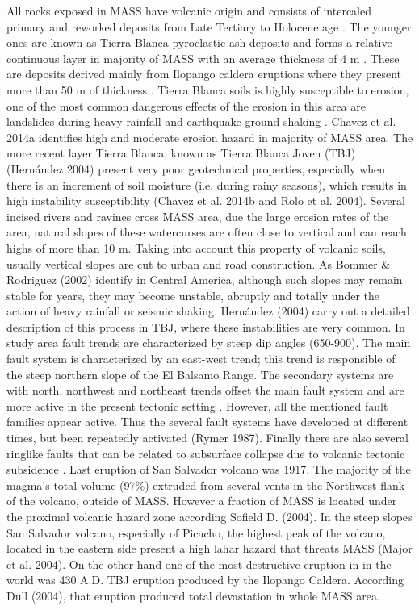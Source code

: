 \documentclass[11pt,twoside]{rmta2010esp}%
\begin{document}
All rocks exposed in MASS have volcanic origin and consists of intercaled primary and reworked deposits from Late Tertiary to Holocene age \cite{schmidt1975}. The younger ones are known as Tierra Blanca pyroclastic ash deposits and forms a relative continuous layer in majority of MASS with an average thickness of 4 m \cite{schmidt1975}. These are deposits derived mainly from Ilopango caldera eruptions where they present more than 50 m of thickness \cite{schmidt1975}. Tierra Blanca soils is highly susceptible to erosion, one of the most common dangerous effects of the erosion in this area are landslides during heavy rainfall and earthquake ground shaking \cite{schmidt1975}. Chavez et al. 2014a identifies high and moderate erosion hazard in majority of MASS area. The more recent layer Tierra Blanca, known as Tierra Blanca Joven (TBJ) (Hernández 2004) present very poor geotechnical properties, especially when there is an increment of soil moisture (i.e. during rainy seasons), which results in high instability susceptibility (Chavez et al. 2014b and Rolo et al. 2004). Several incised rivers and ravines cross MASS area, due the large erosion rates of the area, natural slopes of these watercurses are often close to vertical and can reach highs of more than 10 m. Taking into account this property of volcanic soils, usually vertical slopes are cut to urban and road construction. As Bommer \& Rodriguez (2002) identify in Central America, although such slopes may remain stable for years, they may become unstable, abruptly and totally under the action of heavy rainfall or seismic shaking. Hernández (2004) carry out a detailed description of this process in TBJ, where these instabilities are very common. 
In study area fault trends are characterized by steep dip angles (650-900). The main fault system is characterized by an east-west trend; this trend is responsible of the steep northern slope of the El Balsamo Range.  The secondary systems are with north, northwest and northeast trends offset the main fault system and are more active in the present tectonic setting \cite{schmidt1975}. However, all the mentioned fault families appear active. Thus the several fault systems have developed at different times, but been repeatedly activated (Rymer 1987).   Finally there are also several ringlike faults that can be related to subsurface collapse due to volcanic tectonic subsidence \cite{schmidt1975}.
Last eruption of San Salvador volcano was 1917.  The majority of the magma's total volume (97\%) extruded from several vents in the Northwest flank of the volcano, outside of MASS. However a fraction of MASS is located under the proximal volcanic hazard zone according Sofield D. (2004). In the steep slopes  San Salvador volcano, especially of Picacho, the highest peak of the volcano, located in the eastern side present a high lahar hazard that threats MASS (Major et al. 2004). On the other hand one of the most destructive eruption in in the world was 430 A.D. TBJ eruption produced by the Ilopango Caldera. According Dull (2004), that eruption produced total devastation in whole MASS area. 
\end{document}

